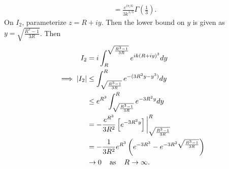 \documentclass{article}
\begin{document}
\begin{itemize}
\begin{align*}
        &= \frac{e^{i\pi/6}}{3k^{1/3}}\Gamma\left(\frac{1}{3}\right).
    \end{align*}
    On $I_2$, parameterize $z = R + iy$. Then the lower bound on $y$ is given as $y = \sqrt{\frac{R^3 - 1}{3R}}$. Then 
    \begin{align*}
        I_2 &= i\int_R^{\sqrt{\frac{R^3 - 1}{3R}}}e^{ik(R + iy)^3}dy\\
        \implies |I_2| &\leq \int_{\sqrt{\frac{R^3 - 1}{3R}}}^Re^{-(3R^2y - y^3)}dy\\
        &\leq e^{R^3}\int_{\sqrt{\frac{R^3-1}{3R}}}^R e^{-3R^2y}dy\\
        &= -\frac{e^{R^3}}{3R^2}\left[e^{-3R^2y}\right]\bigg|_{\sqrt{\frac{R^3 - 1}{3R}}}^R\\
        &= -\frac{1}{3R^2}e^{R^3}\left(e^{-3R^3} - e^{-3R^2\sqrt{\frac{R^3 - 1}{3R}}}\right)\\
        &\to 0 \hspace{0.4cm} \text{as} \hspace{0.4cm} R \to \infty.
    \end{align*}


\end{itemize}
\end{document}
